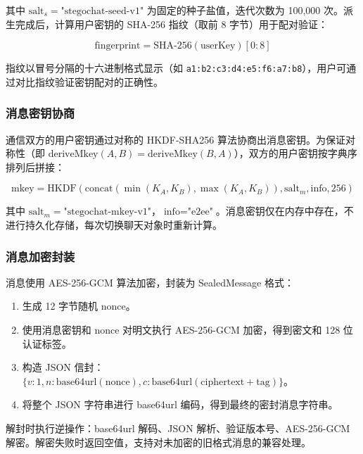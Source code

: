 其中 $\text{salt}_s = \text{"stegochat-seed-v1"}$ 为固定的种子盐值，迭代次数为 100,000 次。派生完成后，计算用户密钥的 SHA-256 指纹（取前 8 字节）用于配对验证：

\begin{equation}\label{eq:fingerprint}
    \text{fingerprint} = \text{SHA-256}(\text{userKey})[0:8]
\end{equation}

指纹以冒号分隔的十六进制格式显示（如 \texttt{a1:b2:c3:d4:e5:f6:a7:b8}），用户可通过对比指纹验证密钥配对的正确性。

\subsubsection{消息密钥协商}

通信双方的用户密钥通过对称的 HKDF-SHA256 算法\supercite{rfc5869}协商出消息密钥。为保证对称性（即 $\text{deriveMkey}(A, B) = \text{deriveMkey}(B, A)$），双方的用户密钥按字典序排列后拼接：

\begin{equation}\label{eq:mkey}
    \text{mkey} = \text{HKDF}(\text{concat}(\min(K_A, K_B), \max(K_A, K_B)), \text{salt}_m, \text{info}, 256)
\end{equation}

其中 $\text{salt}_m = \text{"stegochat-mkey-v1"}$，$\text{info} = \text{"e2ee"}$。消息密钥仅在内存中存在，不进行持久化存储，每次切换聊天对象时重新计算。

\subsubsection{消息加密封装}

消息使用 AES-256-GCM 算法\supercite{nist80038d}加密，封装为 SealedMessage 格式：

\begin{enumerate}
    \item 生成 12 字节随机 nonce。
    \item 使用消息密钥和 nonce 对明文执行 AES-256-GCM 加密，得到密文和 128 位认证标签。
    \item 构造 JSON 信封：$\{v:1, n:\text{base64url}(\text{nonce}), c:\text{base64url}(\text{ciphertext}+\text{tag})\}$。
    \item 将整个 JSON 字符串进行 base64url 编码，得到最终的密封消息字符串。
\end{enumerate}

解封时执行逆操作：base64url 解码、JSON 解析、验证版本号、AES-256-GCM 解密。解密失败时返回空值，支持对未加密的旧格式消息的兼容处理。

